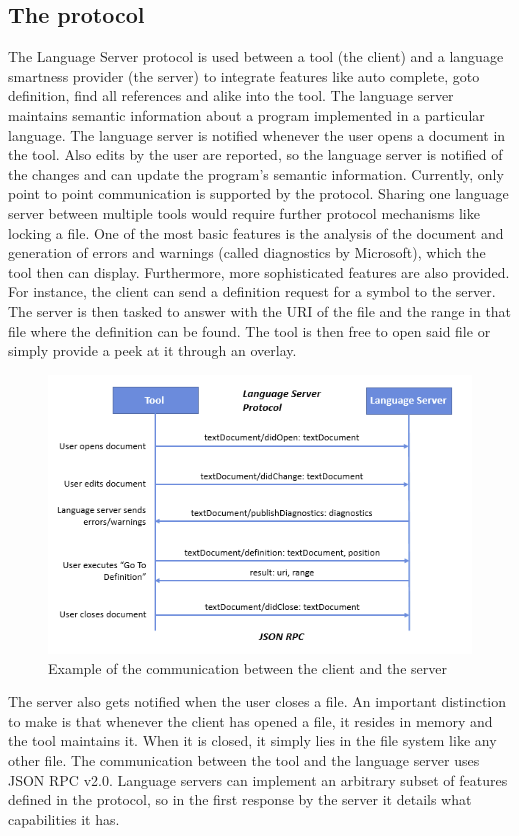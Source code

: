 \subsection{The protocol}
The Language Server protocol is used between a tool (the client) and a language smartness provider (the server) to integrate features like auto complete, goto definition, find all references and alike into the tool. \cite{langserver} \newline
The language server maintains semantic information about a program implemented in a particular language. The language server is notified whenever the user opens a document in the tool. Also edits by the user are reported, so the language server is notified of the changes and can update the program's semantic information. Currently, only point to point communication is supported by the protocol. Sharing one language server between multiple tools would require further protocol mechanisms like locking a file.\newline
One of the most basic features is the analysis of the document and generation of errors and warnings (called diagnostics by Microsoft), which the tool then can display. Furthermore, more sophisticated features are also provided. For instance, the client can send a definition request for a symbol to the server. The server is then tasked to answer with the URI of the file and the range in that file where the definition can be found. The tool is then free to open said file or simply provide a peek at it through an overlay. \newline
\begin{figure}[H]
	\centering
	\includegraphics[width=1\textwidth]{img/langServerOverview}
	\caption{Example of the communication between the client and the server}
	\label{fig:langserveroverview}
\end{figure}
The server also gets notified when the user closes a file. An important distinction to make is that whenever the client has opened a file, it resides in memory and the tool maintains it. When it is closed, it simply lies in the file system like any other file. \newline
The communication between the tool and the language server uses JSON RPC v2.0. Language servers can implement an arbitrary subset of features defined in the protocol, so in the first response by the server it details what capabilities it has. \newline
